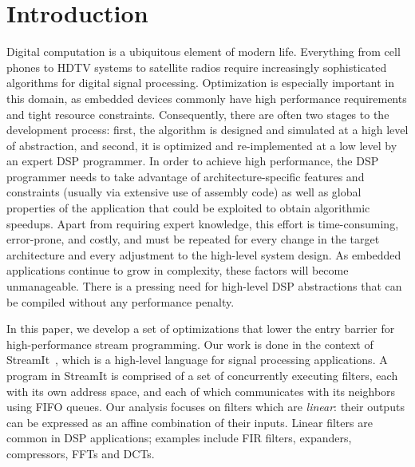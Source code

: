 \documentclass{sig-alternate}
\begin{document}
\section{Introduction}
Digital computation is a ubiquitous element of modern life.
Everything from cell phones to HDTV systems to satellite radios
require increasingly sophisticated algorithms for digital signal
processing.  Optimization is especially important in this domain, as
embedded devices commonly have high performance requirements and tight
resource constraints.  Consequently, there are often two stages to the
development process: first, the algorithm is designed and simulated at
a high level of abstraction, and second, it is optimized and
re-implemented at a low level by an expert DSP programmer.  In order
to achieve high performance, the DSP programmer needs to take
advantage of architecture-specific features and constraints (usually
via extensive use of assembly code) as well as global properties of
the application that could be exploited to obtain algorithmic
speedups.  Apart from requiring expert knowledge, this effort is
time-consuming, error-prone, and costly, and must be repeated for
every change in the target architecture and every adjustment to the
high-level system design.  As embedded applications continue to grow
in complexity, these factors will become unmanageable.  There is a
pressing need for high-level DSP abstractions that can be compiled
without any performance penalty.

In this paper, we develop a set of optimizations that lower the entry
barrier for high-performance stream programming.  Our work is done in
the context of StreamIt~\cite{streamit-asplos,streamitcc}, which is a
high-level language for signal processing applications.  A program in
StreamIt is comprised of a set of concurrently executing filters, each
with its own address space, and each of which communicates with its
neighbors using FIFO queues.  Our analysis focuses on filters which
are {\it linear}: their outputs can be expressed as
an affine combination of their inputs.  Linear filters are common in
DSP applications; examples include FIR filters, expanders,
compressors, FFTs and DCTs.
\end{document}
